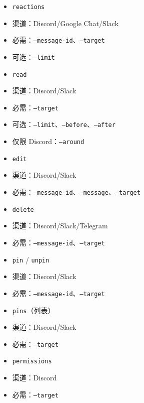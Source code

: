 \begin{itemize}
  \item \texttt{reactions}
  \item 渠道：Discord/Google Chat/Slack
  \item 必需：\texttt{--message-id}、\texttt{--target}
  \item 可选：\texttt{--limit}
\end{itemize}


\begin{itemize}
  \item \texttt{read}
  \item 渠道：Discord/Slack
  \item 必需：\texttt{--target}
  \item 可选：\texttt{--limit}、\texttt{--before}、\texttt{--after}
  \item 仅限 Discord：\texttt{--around}
\end{itemize}


\begin{itemize}
  \item \texttt{edit}
  \item 渠道：Discord/Slack
  \item 必需：\texttt{--message-id}、\texttt{--message}、\texttt{--target}
\end{itemize}


\begin{itemize}
  \item \texttt{delete}
  \item 渠道：Discord/Slack/Telegram
  \item 必需：\texttt{--message-id}、\texttt{--target}
\end{itemize}


\begin{itemize}
  \item \texttt{pin} / \texttt{unpin}
  \item 渠道：Discord/Slack
  \item 必需：\texttt{--message-id}、\texttt{--target}
\end{itemize}


\begin{itemize}
  \item \texttt{pins}（列表）
  \item 渠道：Discord/Slack
  \item 必需：\texttt{--target}
\end{itemize}


\begin{itemize}
  \item \texttt{permissions}
  \item 渠道：Discord
  \item 必需：\texttt{--target}
\end{itemize}


